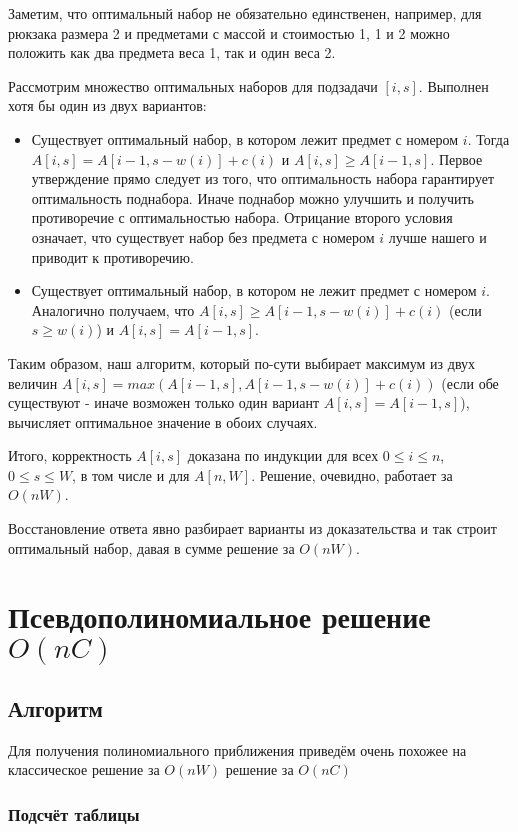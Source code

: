\documentclass{article}
\begin{document}
	Заметим, что оптимальный набор не обязательно единственен, например, для рюкзака размера 2 и предметами с массой и стоимостью 1, 1 и 2 можно положить как два предмета веса 1, так и один веса 2. 
	
	Рассмотрим множество оптимальных наборов для подзадачи $[i, s]$. Выполнен хотя бы один из двух вариантов:
	
	\begin{itemize}
		\item Существует оптимальный набор, в котором лежит предмет с номером $i$. Тогда $A[i, s] = A[i - 1, s - w(i)] + c(i)$ и $A[i, s] \geq A[i - 1, s]$. Первое утверждение прямо следует из того, что оптимальность набора гарантирует оптимальность поднабора. Иначе поднабор можно улучшить и получить противоречие с оптимальностью набора. Отрицание второго условия означает, что существует набор без предмета с номером $i$ лучше нашего и приводит к противоречию.
		\item Существует оптимальный набор, в котором не лежит предмет с номером $i$. Аналогично получаем, что $A[i, s] \geq A[i - 1, s - w(i)] + c(i)$ (если $s \geq w(i)$) и $A[i, s] = A[i - 1, s]$.
	\end{itemize}
	
	Таким образом, наш алгоритм, который по-сути выбирает максимум из двух величин $A[i, s] = max(A[i - 1, s], A[i - 1, s - w(i)] + c(i))$ (если обе существуют - иначе возможен только один вариант $A[i, s] = A[i - 1, s]$), вычисляет оптимальное значение в обоих случаях. 
	
	Итого, корректность $A[i, s]$ доказана по индукции для всех $ 0 \leq i \leq n$, $0 \leq s \leq W$, в том числе и для $A[n, W]$. Решение, очевидно, работает за $O(nW)$.
	
	Восстановление ответа явно разбирает варианты из доказательства и так строит оптимальный набор, давая в сумме решение за $O(nW)$.


\section{Псевдополиномиальное решение $O(nC)$}
	\subsection{Алгоритм}
	
	Для получения полиномиального приближения приведём очень похожее на классическое решение за $O(nW)$ решение за $O(nC)$
	
	\subsubsection{Подсчёт таблицы}
		
\end{document}
